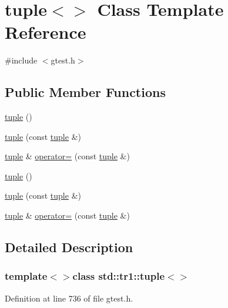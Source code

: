 \hypertarget{classstd_1_1tr1_1_1tuple_3_4}{\section{tuple$<$$>$ \-Class \-Template \-Reference}
\label{d6/d33/classstd_1_1tr1_1_1tuple_3_4}
}


{\ttfamily \#include $<$gtest.\-h$>$}

\subsection*{\-Public \-Member \-Functions}
\begin{DoxyCompactItemize}
\item 
\hyperlink{classstd_1_1tr1_1_1tuple_3_4_a530b48c0bc4312965b1aebb57f400e21}{tuple} ()
\item 
\hyperlink{classstd_1_1tr1_1_1tuple_3_4_ad30c2d7d68118997f02b54234a7ab2b7}{tuple} (const \hyperlink{classstd_1_1tr1_1_1tuple}{tuple} \&)
\item 
\hyperlink{classstd_1_1tr1_1_1tuple}{tuple} \& \hyperlink{classstd_1_1tr1_1_1tuple_3_4_a5df1098974ddabf37b7968d5cd4caced}{operator=} (const \hyperlink{classstd_1_1tr1_1_1tuple}{tuple} \&)
\item 
\hyperlink{classstd_1_1tr1_1_1tuple_3_4_a530b48c0bc4312965b1aebb57f400e21}{tuple} ()
\item 
\hyperlink{classstd_1_1tr1_1_1tuple_3_4_ad30c2d7d68118997f02b54234a7ab2b7}{tuple} (const \hyperlink{classstd_1_1tr1_1_1tuple}{tuple} \&)
\item 
\hyperlink{classstd_1_1tr1_1_1tuple}{tuple} \& \hyperlink{classstd_1_1tr1_1_1tuple_3_4_a5df1098974ddabf37b7968d5cd4caced}{operator=} (const \hyperlink{classstd_1_1tr1_1_1tuple}{tuple} \&)
\end{DoxyCompactItemize}


\subsection{\-Detailed \-Description}
\subsubsection*{template$<$$>$class std\-::tr1\-::tuple$<$$>$}



\-Definition at line 736 of file gtest.\-h.



